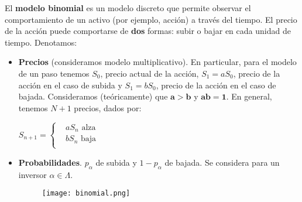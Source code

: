 \documentclass[
10pt, %
a4paper, %
oneside, %
headinclude,footinclude, %
BCOR5mm, %
]{scrartcl}
\newcommand{\n}[1]{\textbf{#1}}
\newcommand{\sub}[1]{_{#1}}
\newcommand{\f}[1]{{\large{${#1}$}}}
\newcommand{\boldf}[1]{\f{\boldsymbol{#1}}}
\newcounter{ex}
\begin{document}
		El \n{modelo binomial} es un modelo discreto que permite observar el comportamiento de un activo (por ejemplo, acción) a través del tiempo. El precio de la acción puede comportarse de \n{dos} formas: subir o bajar en cada unidad de tiempo. Denotamos:
		\begin{itemize}
			\item \n{Precios} (consideramos modelo multiplicativo). En particular, para el modelo de un paso tenemos \f{S\sub{0}}, precio actual de la acción, \f{S\sub{1} = a S\sub{0}}, precio de la acción en el caso de subida y \f{S\sub{1} = b S\sub{0}}, precio de la acción en el caso de bajada. Consideramos (teóricamente) que \boldf{a > b} y \boldf{a b = 1}. En general, tenemos \f{N+1} precios, dados por: 
			\begin{center} \f{ S\sub{n+1} = \left\{
				\begin{aligned} 
					& aS\sub{n} \text{   alza} \\
					& bS\sub{n} \text{   baja} \\
				\end{aligned}
				}
			\end{center}
			\item \n{Probabilidades}. \f{p\sub{\alpha}} de subida y \f{1-p\sub{\alpha}} de bajada. Se considera para un inversor \f{\alpha \in \Lambda}.

				\begin{figure}[h!]
					\begin{center}
					\texttt{[image: binomial.png]}
					\end{center}
				\end{figure}
			

\end{itemize}
\end{document}
